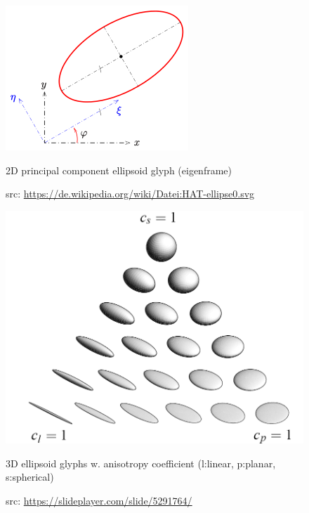 \documentclass{scrartcl}
\begin{document}
\begin{figure}[!t]
\hskip 22pt
  \begin{minipage}[!t]{0.4\textwidth}
    \includegraphics[width=\textwidth]{img/HAT.png}
   \caption{2D principal component ellipsoid\/ glyph (eigenframe)}
   \label{hat}
   \caption*{src: \url{https://de.wikipedia.org/wiki/Datei:HAT-ellipse0.svg}}
  \end{minipage} \hskip 40pt
  \begin{minipage}[!t]{0.4\textwidth}
    \includegraphics[width=\textwidth]{img/glyphs.png}
    \caption{3D ellipsoid glyphs w. anisotropy coefficient (l:linear, p:planar, s:spherical)}
    \label{3Dglyphs}
   \caption*{src: \url{https://slideplayer.com/slide/5291764/}}
  \end{minipage}
\end{figure}
\end{document}
